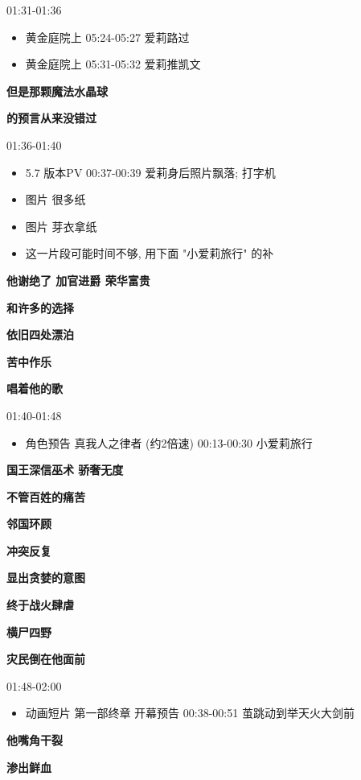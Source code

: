\documentclass[a4paper]{article}
\begin{document}
01:31-01:36

\begin{itemize}
    \item 黄金庭院上 05:24-05:27 爱莉路过
    \item 黄金庭院上 05:31-05:32 爱莉推凯文
\end{itemize}

\textbf{但是那颗魔法水晶球}

\textbf{的预言从来没错过}

01:36-01:40

\begin{itemize}
    \item 5.7 版本PV 00:37-00:39 爱莉身后照片飘落; 打字机
    \item 图片 很多纸
    \item 图片 芽衣拿纸
    \item 这一片段可能时间不够, 用下面 "小爱莉旅行" 的补
\end{itemize}

\textbf{他谢绝了 加官进爵 荣华富贵}

\textbf{和许多的选择}

\textbf{依旧四处漂泊}

\textbf{苦中作乐}

\textbf{唱着他的歌}

01:40-01:48

\begin{itemize}
    \item 角色预告 真我人之律者 (约2倍速) 00:13-00:30 小爱莉旅行
\end{itemize}

\textbf{国王深信巫术 骄奢无度}

\textbf{不管百姓的痛苦}

\textbf{邻国环顾}

\textbf{冲突反复}

\textbf{显出贪婪的意图}

\textbf{终于战火肆虐}

\textbf{横尸四野}

\textbf{灾民倒在他面前}

01:48-02:00

\begin{itemize}
    \item 动画短片 第一部终章 开幕预告 00:38-00:51 茧跳动到举天火大剑前
\end{itemize}

\textbf{他嘴角干裂}

\textbf{渗出鲜血}
\end{document}
